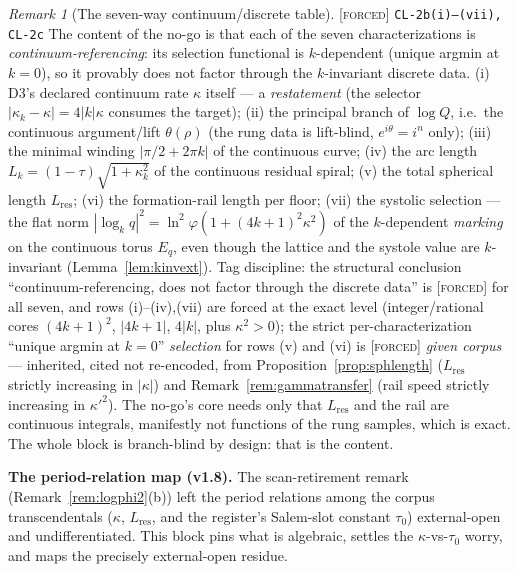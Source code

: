 \documentclass[11pt]{article}
\newcommand{\tagF}{\textcolor{cF}{\textsc{[forced]}}}
\newcommand{\hx}[1]{\textcolor{cC}{\footnotesize\texttt{#1}}}
\newcommand{\gp}{\varphi}
\theoremstyle{plain}
\theoremstyle{definition}
\theoremstyle{remark}
\newtheorem{remark}[theorem]{Remark}
\begin{document}
\begin{remark}[The seven-way continuum/discrete table]\label{rem:sevenway}\tagF{} \hx{CL-2b(i)--(vii), CL-2c}
The content of the no-go is that each of the seven characterizations is
\emph{continuum-referencing}: its selection functional is $k$-dependent
(unique argmin at $k=0$), so it provably does not factor through the
$k$-invariant discrete data. (i) D3's declared continuum rate $\kappa$ itself
--- a \emph{restatement} (the selector $|\kappa_k-\kappa|=4|k|\kappa$ consumes
the target); (ii) the principal branch of $\log Q$, i.e.\ the continuous
argument/lift $\theta(\rho)$ (the rung data is lift-blind, $e^{i\theta}=i^n$
only); (iii) the minimal winding $|\pi/2+2\pi k|$ of the continuous curve;
(iv) the arc length $L_k=(1-\tau)\sqrt{1+\kappa_k^2}$ of the continuous
residual spiral; (v) the total spherical length $L_{\mathrm{res}}$; (vi) the
formation-rail length per floor; (vii) the systolic selection --- the flat
norm $|\log_kq|^2=\ln^2\gp(1+(4k+1)^2\kappa^2)$ of the $k$-dependent
\emph{marking} on the continuous torus $E_q$, even though the lattice and the
systole value are $k$-invariant (Lemma~\ref{lem:kinvext}). Tag discipline: the
structural conclusion ``continuum-referencing, does not factor through the
discrete data'' is \tagF{} for all seven, and rows (i)--(iv),(vii) are forced
at the exact level (integer/rational cores $(4k+1)^2$, $|4k+1|$, $4|k|$, plus
$\kappa^2>0$); the strict per-characterization ``unique argmin at $k=0$''
\emph{selection} for rows (v) and (vi) is \tagF{}\emph{ given corpus} ---
inherited, cited not re-encoded, from Proposition~\ref{prop:sphlength}
($L_{\mathrm{res}}$ strictly increasing in $|\kappa|$) and
Remark~\ref{rem:gammatransfer} (rail speed strictly increasing in
$\kappa'^2$). The no-go's core needs only that $L_{\mathrm{res}}$ and the rail
are continuous integrals, manifestly not functions of the rung samples, which
is exact. The whole block is branch-blind by design: that is the content.
\end{remark}

\smallskip\noindent
\textbf{The period-relation map (v1.8).} The scan-retirement remark
(Remark~\ref{rem:logphi2}(b)) left the period relations among the corpus
transcendentals ($\kappa$, $L_{\mathrm{res}}$, and the register's Salem-slot
constant $\tau_0$) external-open and undifferentiated. This block pins what is
algebraic, settles the $\kappa$-vs-$\tau_0$ worry, and maps the precisely
external-open residue.
\end{document}
